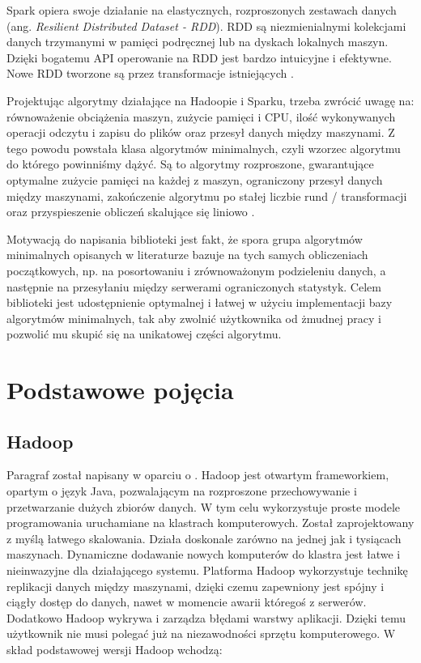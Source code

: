 \documentclass[licencjacka]{pracamgr}
\begin{document}
Spark opiera swoje działanie na elastycznych, rozproszonych zestawach danych (ang. \textit{Resilient Distributed Dataset - RDD}). RDD są niezmienialnymi kolekcjami danych trzymanymi w pamięci podręcznej lub na dyskach lokalnych maszyn. Dzięki bogatemu API operowanie na RDD jest bardzo intuicyjne i efektywne. Nowe RDD tworzone są przez transformacje istniejących \cite{zaharia2010spark}.

Projektując algorytmy działające na Hadoopie i Sparku, trzeba zwrócić uwagę na: równoważenie obciążenia maszyn, zużycie pamięci i CPU, ilość wykonywanych operacji odczytu i zapisu do plików oraz przesył danych między maszynami. Z tego powodu powstała klasa algorytmów minimalnych, czyli wzorzec algorytmu do którego powinniśmy dążyć. Są to algorytmy rozproszone, gwarantujące optymalne zużycie pamięci na każdej z maszyn, ograniczony przesył danych między maszynami, zakończenie algorytmu po stałej liczbie rund / transformacji oraz przyspieszenie obliczeń skalujące się liniowo \cite{tao2013minimal}. 

Motywacją do napisania biblioteki jest fakt, że spora grupa algorytmów minimalnych opisanych w literaturze bazuje na tych samych obliczeniach początkowych, np. na posortowaniu i zrównoważonym podzieleniu danych, a następnie na przesyłaniu między serwerami ograniczonych statystyk. Celem biblioteki jest udostępnienie optymalnej i łatwej w użyciu implementacji bazy algorytmów minimalnych, tak aby zwolnić użytkownika od żmudnej pracy i pozwolić mu skupić się na unikatowej części algorytmu.

\chapter{Podstawowe pojęcia}\label{r:pojecia}

\section{Hadoop}
Paragraf został napisany w oparciu o \cite{shvachko2010hadoop, taylor2010overview, white2012hadoop}. Hadoop jest otwartym frameworkiem, opartym o język Java, pozwalającym na rozproszone przechowywanie i przetwarzanie dużych zbiorów danych. W tym celu wykorzystuje proste modele programowania uruchamiane na klastrach komputerowych. Został zaprojektowany z myślą łatwego skalowania. Działa doskonale zarówno na jednej jak i tysiącach maszynach. Dynamiczne dodawanie nowych komputerów do klastra jest łatwe i nieinwazyjne dla działającego systemu. Platforma Hadoop wykorzystuje technikę replikacji danych między maszynami, dzięki czemu zapewniony jest spójny i ciągły dostęp do danych, nawet w momencie awarii któregoś z serwerów. Dodatkowo Hadoop wykrywa i zarządza błędami warstwy aplikacji. Dzięki temu użytkownik nie musi polegać już na niezawodności sprzętu komputerowego. W skład podstawowej wersji Hadoop wchodzą:
\end{document}
